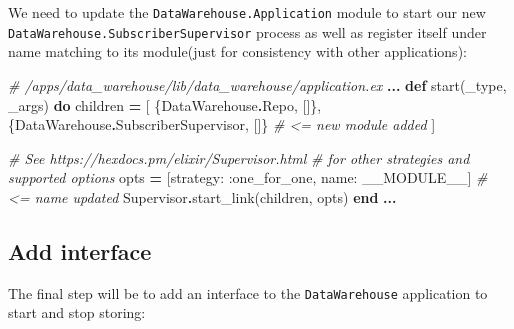 \documentclass[
]{book}
\newenvironment{Shaded}{\begin{snugshade}}{\end{snugshade}}
\newcommand{\CommentTok}[1]{\textcolor[rgb]{0.56,0.35,0.01}{\textit{#1}}}
\newcommand{\ConstantTok}[1]{\textcolor[rgb]{0.00,0.00,0.00}{#1}}
\newcommand{\KeywordTok}[1]{\textcolor[rgb]{0.13,0.29,0.53}{\textbf{#1}}}
\newcommand{\NormalTok}[1]{#1}
\newcommand{\OperatorTok}[1]{\textcolor[rgb]{0.81,0.36,0.00}{\textbf{#1}}}
\newcommand{\VariableTok}[1]{\textcolor[rgb]{0.00,0.00,0.00}{#1}}
\begin{document}
We need to update the \texttt{DataWarehouse.Application} module to start our new \texttt{DataWarehouse.SubscriberSupervisor} process as well as register itself under name matching to its module(just for consistency with other applications):

\begin{Shaded}
\begin{Highlighting}[]
  \CommentTok{\# /apps/data\_warehouse/lib/data\_warehouse/application.ex}
  \OperatorTok{...}
  \KeywordTok{def}\NormalTok{ start(\_type, \_args) }\KeywordTok{do}
\NormalTok{    children }\OperatorTok{=}\NormalTok{ [}
\NormalTok{      \{}\ConstantTok{DataWarehouse}\OperatorTok{.}\ConstantTok{Repo}\NormalTok{, []\},}
\NormalTok{      \{}\ConstantTok{DataWarehouse}\OperatorTok{.}\ConstantTok{SubscriberSupervisor}\NormalTok{, []\} }\CommentTok{\# \textless{}= new module added}
\NormalTok{    ]}

    \CommentTok{\# See https://hexdocs.pm/elixir/Supervisor.html}
    \CommentTok{\# for other strategies and supported options}
\NormalTok{    opts }\OperatorTok{=}\NormalTok{ [}\VariableTok{strategy:} \VariableTok{:one\_for\_one}\NormalTok{, }\VariableTok{name:} \ConstantTok{\_\_MODULE\_\_}\NormalTok{] }\CommentTok{\# \textless{}= name updated}
    \ConstantTok{Supervisor}\OperatorTok{.}\NormalTok{start\_link(children, opts)}
  \KeywordTok{end}
  \OperatorTok{...}
\end{Highlighting}
\end{Shaded}

\hypertarget{add-interface}{%
\subsection{Add interface}\label{add-interface}}

The final step will be to add an interface to the \texttt{DataWarehouse} application to start and stop storing:
\end{document}
